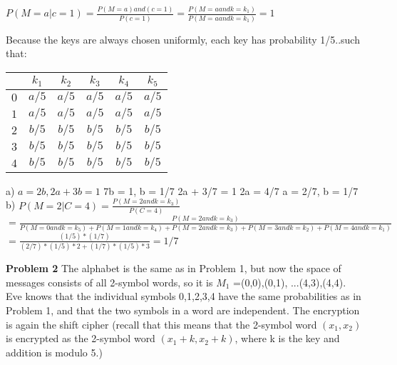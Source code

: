 \documentclass[12pt,letterpaper,final]{report}
\begin{document}
\bigskip $P (M = a | c = 1) = \frac{P(M=a) and  (c = 1)}{P (c = 1)} = \frac{P(M=a  and   k = k_{1})}{P (M = a and  k = k_{1})} = 1$

\bigskip Because the keys are always chosen uniformly, each key has probability 1/5..such that:  
\indent\begin{tabular}{|c|c|c|c|c|c|}
\hline
$ $ & $k_{1}$ & $k_{2}$ & $k_{3}$ & $k_{4}$ & $k_{5}$ \\
\hline
$0$ & $ a/5$ & $ a/5$ & $ a/5$ & $ a/5$ & $ a/5$ \\
$1$ & $ a/5$ & $ a/5$ & $ a/5$ & $ a/5$ & $ a/5$ \\
$2$ & $ b/5$ & $ b/5$ & $ b/5$ & $ b/5$ & $ b/5$ \\
$3$ & $ b/5$ & $ b/5$ & $ b/5$ & $ b/5$ & $ b/5$ \\
$4$ & $ b/5$ & $ b/5$ & $ b/5$ & $ b/5$ & $ b/5$ \\
\hline
\end{tabular}
\newline a) $a = 2b, 2a + 3b = 1$
\newline 7b = 1, b = 1/7
\newline 2a + 3/7 = 1
\newline 2a = 4/7
\newline a = 2/7, b = 1/7
\bigskip\newline 
b)
$P (M=2 | C = 4) = \frac{P(M=2 and k=k_3)}{P(C=4)}$
\newline$=\frac{P(M=2 and k=k_3)}{P(M=0 and k=k_5) + P(M=1 and k=k_4) + P(M=2 and k=k_3) + P(M=3 and k=k_2) + P(M=4 and k=k_1)}$
\newline$=\frac{(1/5)*(1/7)}{(2/7)*(1/5)*2 + (1/7)*(1/5)*3} = 1/7$

\bigskip
\noindent\textbf{Problem 2} The alphabet is the same as in Problem 1, but now the space of messages consists of all 2-symbol words, so it is $M_{1}$ ={(0,0),(0,1), ...(4,3),(4,4)}. Eve knows that the individual symbols 0,1,2,3,4 have the same probabilities as in Problem 1, and that the two symbols in a word are independent. The encryption is again the shift cipher (recall that this means that the 2-symbol word
 $(x_{1}, x_{2})$ is encrypted as the 2-symbol word  $(x_{1}+k, x_{2}+k)$, where k is the key and addition is modulo 5.)
\end{document}
